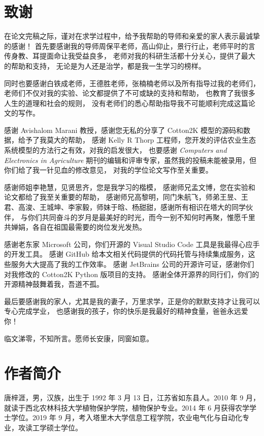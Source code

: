 \documentclass[a4paper,oneside,zihao=-4,AutoFakeBold,fontset=windows]{ctexbook}
\begin{document}
\begin{spacing}{}
  
  
  
  
  
  
  \backmatter
  \printbibliography
  \chapter*{致谢}

  在论文完稿之际，谨对在求学过程中，给予我帮助的导师和亲爱的家人表示最诚挚的感谢！%
  首先要感谢我的导师周保平老师，高山仰止，景行行止，老师平时的言传身教、耳提面命让我受益良多，%
  老师对我的科研生活都十分关心，提供了最大的帮助和支持，%
  无论是为人还是治学，都是我一生学习的榜样。%

  同时也要感谢白铁成老师，王德胜老师，张楠楠老师以及所有指导过我的老师们，%
  老师们不仅对我的实验、论文都提供了不可或缺的支持和帮助，%
  也教育了我很多人生的道理和社会的规则，%
  没有老师们的悉心帮助指导我不可能顺利完成这篇论文的写作。%

  感谢 Avishalom Marani 教授，感谢您无私的分享了 Cotton2K 模型的源码和数据，给予了我莫大的帮助，%
  感谢 Kelly R Thorp 工程师，您开发的评估农业生态系统模型的方法行之有效，对我的启发很大，%
  也要感谢 \textit{Computers and Electronics in Agriculture} 期刊的编辑和评审专家，虽然我的投稿未能被录用，但你们给了我一针见血的修改意见，%
  对我的学位论文写作至关重要。

  感谢师姐李艳慧，见贤思齐，您是我学习的楷模，%
  感谢师兄孟文博，您在实验和论文都给了我至关重要的帮助，%
  感谢师兄高黎明，同门朱航飞，师弟王昱、王君、高浚、王城坤、李家毅，师妹于晗、杨甜甜，感谢所有相识在塔大的同学伙伴，%
  与你们共同奋斗的岁月是最美好的时光，而今一别不知何时再聚，惟愿千里共婵娟，各自在祖国最需要的岗位发光发热。%
  
  感谢老东家 Microsoft 公司，你们开源的 Visual Studio Code 工具是我最得心应手的开发工具。%
  感谢 GitHub 给本文相关代码提供的代码托管与持续集成服务，这些服务大大提高了我的工作效率。%
  感谢 JetBrains 公司的开源许可证，感谢你们对我修改的 Cotton2K Python 版项目的支持。%
  感谢全体开源界的同行们，你们的开源精神鼓舞着我，吾道不孤。

  最后要感谢我的家人，尤其是我的妻子，万里求学，正是你的默默支持才让我可以专心完成学业，%
  也感谢我的孩子，你的快乐是我最好的精神食量，爸爸永远爱你！%

  临文涕零，不知所言。愿师长安康，同窗如意。

  \chapter*{作者简介}
  唐梓涯，男，汉族，出生于 1992 年 3 月 13 日，江苏省如东县人。2010 年 9 月，就读于西北农林科技大学植物保护学院，植物保护专业。2014 年 6 月获得农学学士学位。2019 年 9 月，考入塔里木大学信息工程学院，农业电气化与自动化专业，攻读工学硕士学位。


\end{spacing}
\end{document}
